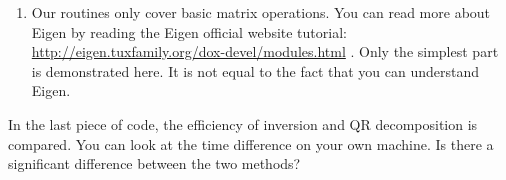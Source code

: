 \begin{enumerate}
    \item Our routines only cover basic matrix operations. You can read more about Eigen by reading the Eigen official website tutorial: \\ { \url{http://eigen.tuxfamily.org/dox-devel/modules.html} }. Only the simplest part is demonstrated here. It is not equal to the fact that you can understand Eigen.
\end{enumerate}

In the last piece of code, the efficiency of inversion and QR decomposition is compared. You can look at the time difference on your own machine. Is there a significant difference between the two methods?
